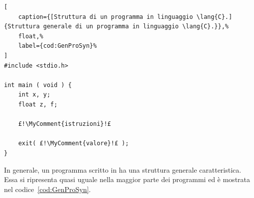 \begin{lstlisting}[
	caption={[Struttura di un programma in linguaggio \lang{C}.] {Struttura generale di un programma in linguaggio \lang{C}.}},%
	float,%
	label={cod:GenProSyn}%
]
#include <stdio.h>

int main ( void ) {
	int x, y;
	float z, f;

	£!\MyComment{istruzioni}!£

	exit( £!\MyComment{valore}!£ );
}
\end{lstlisting}
In  generale, un programma scritto in  ha una struttura generale caratteristica. Essa si ripresenta quasi uguale nella maggior parte dei programmi ed è mostrata nel codice~\ref{cod:GenProSyn}.
